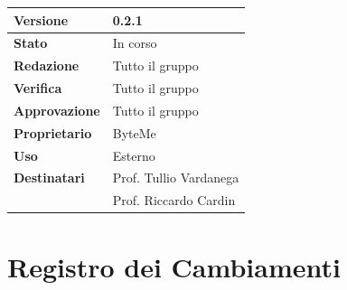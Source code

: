 \documentclass[11pt,a4paper]{article}
\begin{document}
\begin{titlepage}
    \begin{table}[H]
        \centering
        \begin{tabular}{|l|p{5cm}|}
            \hline
            \textbf{Versione} & 0.2.1 \\
            \hline
            \textbf{Stato} & In corso \\
            \hline
            \textbf{Redazione} & Tutto il gruppo \\
            \hline
            \textbf{Verifica} & Tutto il gruppo \\
            \hline
            \textbf{Approvazione} & Tutto il gruppo \\
            \hline
            \textbf{Proprietario} & ByteMe \\
            \hline
            \textbf{Uso} & Esterno \\
            \hline
            \textbf{Destinatari} & Prof. Tullio Vardanega \\ & Prof. Riccardo Cardin \\
            \hline
        \end{tabular}
    \end{table}
    
    \vfill
\end{titlepage}

\thispagestyle{empty}
\section*{Registro dei Cambiamenti}
\end{document}
